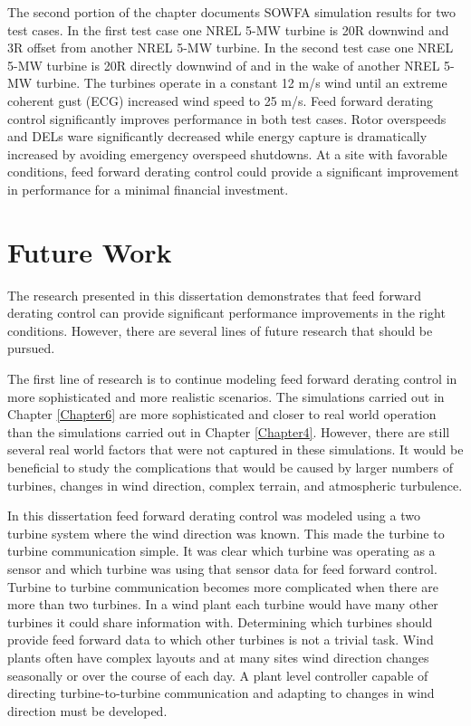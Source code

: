 The second portion of the chapter documents SOWFA simulation results for two test cases. In the first test case one NREL 5-MW turbine is 20R downwind and 3R offset from another NREL 5-MW turbine. In the second test case one NREL 5-MW turbine is 20R directly downwind of and in the wake of another NREL 5-MW turbine. The turbines operate in a constant 12 m/s wind until an extreme coherent gust (ECG) increased wind speed to 25 m/s. Feed forward derating control significantly improves performance in both test cases. Rotor overspeeds and DELs ware significantly decreased while energy capture is dramatically increased by avoiding emergency overspeed shutdowns.  At a site with favorable conditions, feed forward derating control could provide a significant improvement in performance for a minimal financial investment.








\section{Future Work}

The research presented in this dissertation demonstrates that feed forward derating control can provide significant performance improvements in the right conditions. However, there are several lines of future research that should be pursued. 

The first line of research is to continue modeling feed forward derating control in more sophisticated and more realistic scenarios. The simulations carried out in Chapter \ref{Chapter6} are more sophisticated and closer to real world operation than the simulations carried out in Chapter \ref{Chapter4}. However, there are still several real world factors that were not captured in these simulations. It would be beneficial  to study the complications that would be caused by larger numbers of turbines, changes in wind direction, complex terrain, and atmospheric turbulence.

In this dissertation feed forward derating control was modeled using a two turbine system where the wind direction was known. This made the turbine to turbine communication simple. It was clear which turbine was operating as a sensor and which turbine was using that sensor data for feed forward control. Turbine to turbine communication becomes more complicated when there are more than two turbines. In a wind plant each turbine would have many other turbines it could share information with. Determining which turbines should provide feed forward data to which other turbines is not a trivial task. Wind plants often have complex layouts and at many sites wind direction changes seasonally or over the course of each day. A plant level controller capable of directing turbine-to-turbine communication and adapting to changes in wind direction must be developed. 

